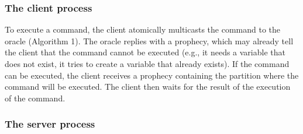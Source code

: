 \subsubsection{The client process} 

To execute a command, the client atomically multicasts the command to the oracle (Algorithm 1).
The oracle replies with a prophecy, which may already tell the client that the command cannot be executed (e.g., it needs a variable that does not exist, it tries to create a variable that already exists).
If the command can be executed, the client receives a prophecy containing the partition where the command will be executed. The client then waits for the result of the execution of the command.



\subsubsection{The server process} 

